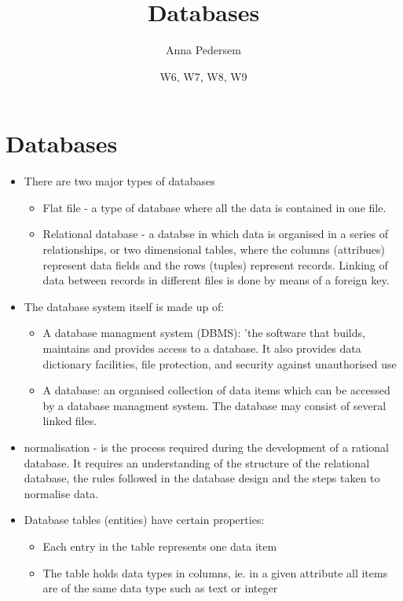 \documentclass[12pt, a4, twoside]{article}
\title{Databases}
\author{Anna Pedersem}
\date{W6, W7, W8, W9}
\begin{document}
\maketitle

\section{Databases}
\begin{center}
  \begin{itemize}
    \item There are two major types of databases
    \begin{itemize}
      \item Flat file - a type of database where all the data is contained in one file. 
      \item Relational database - a databse in which data is organised in a series of relationships, or two dimensional tables, where the columns (attribues) represent data fields and the rows (tuples) represent records. Linking of data between records in different files is done by means of a foreign key. 
    \end{itemize}
    \item The database system itself is made up of: 
    \begin{itemize}
      \item A database managment system (DBMS): 'the software that builds, maintains and provides access to a database. It also provides data dictionary facilities, file protection, and security against unauthorised use
      \item A database: an organised collection of data items which can be accessed by a database managment system. The database may consist of several linked files. 
    \end{itemize}
    \item normalisation - is the process required during the development of a rational database. It requires an understanding of the structure of the relational database, the rules followed in the database design and the steps taken to normalise data. 
    \item Database tables (entities) have certain properties:
    \begin{itemize}
      \item Each entry in the table represents one data item 
      \item The table holds data types in columns, ie. in a given attribute  all items are of the same data type such as text or integer 

\end{itemize}
\end{itemize}
\end{center}
\end{document}
